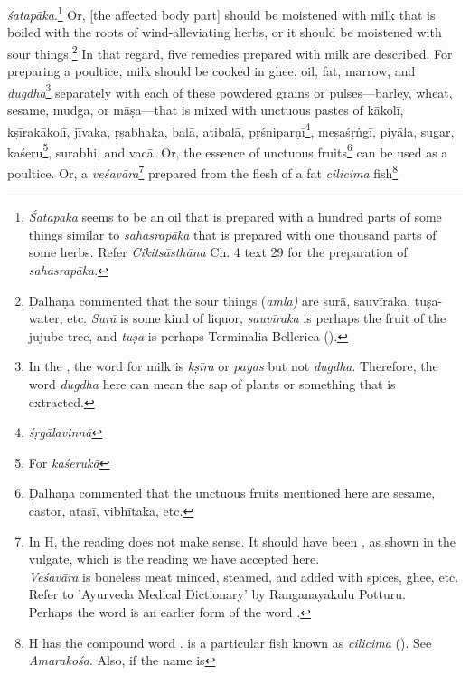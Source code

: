 \begin{translation}
    \emph{śatapāka}.\footnote{\emph{Śatapāka} seems to be an oil that is 
    prepared with a hundred parts of some things similar to \textit{sahasrapāka} 
    that is prepared with one thousand parts of some herbs. Refer 
    \textit{Cikitsāsthāna} Ch. 4 text 29 for the preparation of 
    \textit{sahasrapāka}.} Or, [the affected body part] should be moistened with 
    milk that is boiled with the roots of wind-alleviating herbs, or it should be 
    moistened with sour things.\footnote{Ḍalhaṇa commented 
    \citep[425]{vulgate} that the sour things (\textit{amla)} are \gls{surā}, 
    \gls{sauvīraka}, \gls{tuṣa}-water, etc. \textit{Surā} is some kind of liquor, 
    \textit{sauvīraka} is perhaps the fruit of the jujube tree, and \textit{tuṣa} is 
    perhaps Terminalia Bellerica ().} In that regard, five remedies 
    prepared with milk are described. For preparing a poultice, milk should be 
    cooked in ghee, oil, fat, marrow, and \emph{dugdha}\footnote{In the \SS, the 
    word for milk is \textit{kṣīra} or \textit{payas} but not \textit{dugdha}. 
    Therefore, the word \textit{dugdha} here can mean the sap of plants or 
    something that is extracted.} separately with each of these powdered grains or 
    pulses---barley, wheat, sesame, \gls{mudga}, or \gls{māṣa}---that is mixed 
    with unctuous pastes of \gls{kākolī}, \gls{kṣīrakākolī}, \gls{jīvaka}, 
    \gls{ṛṣabhaka}, \gls{balā}, \gls{atibalā}, 
    \gls{pṛśniparṇī}\footnote{\emph{śṛgālavinnā}}, \gls{meṣaśṛṅgī}, \gls{piyāla}, 
    sugar, \gls{kaśeru}\footnote{For \emph{kaśerukā}}, \gls{surabhi}, and 
    \gls{vacā}. Or, the essence of unctuous fruits\footnote{Ḍalhaṇa commented 
    \citep[425]{vulgate} that the unctuous fruits mentioned here are sesame, 
    castor, \gls{atasī}, \gls{vibhītaka}, etc.} can be used as a poultice. Or, a 
    \textit{veśavāra}\footnote{In H, the reading  does not make 
    sense. It should have been , as shown in the vulgate, which is 
    the reading we have accepted here.\\ \textit{Veśavāra} is boneless meat 
    minced, steamed, and added with spices, ghee, etc. Refer to 'Ayurveda 
    Medical Dictionary' by Ranganayakulu Potturu.\\Perhaps the word 
     is an earlier form of the word .} prepared from 
    the flesh of a fat \textit{cilicima} fish\footnote{H has the compound word 
    .  is a particular fish known as 
    \textit{cilicima} (). See \textit{Amarakośa}. Also, if the name is 
}
\end{translation}
